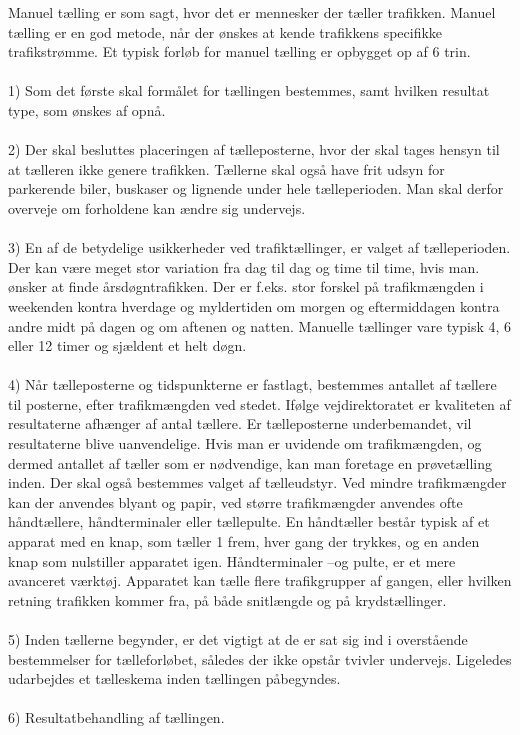 Manuel tælling er som sagt, hvor det er mennesker der tæller trafikken. Manuel tælling er en god metode,
når der ønskes at kende trafikkens specifikke trafikstrømme. Et typisk forløb for manuel tælling er opbygget
op af 6 trin.
\\\\
1) Som det første skal formålet for tællingen bestemmes, samt hvilken resultat type, som ønskes af opnå.
\\\\
2) Der skal besluttes placeringen af tælleposterne, hvor der skal tages hensyn til at tælleren ikke genere
trafikken. Tællerne skal også have frit udsyn for parkerende biler, buskaser og lignende under hele
tælleperioden. Man skal derfor overveje om forholdene kan ændre sig undervejs.
\\\\
3) En af de betydelige usikkerheder ved trafiktællinger, er valget af tælleperioden. Der kan være meget stor
variation fra dag til dag og time til time, hvis man. ønsker at finde årsdøgntrafikken. Der er f.eks. stor forskel
på trafikmængden i weekenden kontra hverdage og myldertiden om morgen og eftermiddagen kontra
andre midt på dagen og om aftenen og natten. Manuelle tællinger vare typisk 4, 6 eller 12 timer og
sjældent et helt døgn.
\\\\
4) Når tælleposterne og tidspunkterne er fastlagt, bestemmes antallet af tællere til posterne, efter
trafikmængden ved stedet. Ifølge vejdirektoratet er kvaliteten af resultaterne afhænger af antal tællere. Er
tælleposterne underbemandet, vil resultaterne blive uanvendelige. Hvis man er uvidende om
trafikmængden, og dermed antallet af tæller som er nødvendige, kan man foretage en prøvetælling inden.
Der skal også bestemmes valget af tælleudstyr. Ved mindre trafikmængder kan der anvendes blyant og papir, ved større trafikmængder anvendes ofte håndtællere, håndterminaler eller tællepulte.
En håndtæller består typisk af et apparat med en knap, som tæller 1 frem, hver gang der trykkes, og en anden knap som nulstiller apparatet igen. Håndterminaler –og pulte, er et mere avanceret værktøj. Apparatet kan tælle flere trafikgrupper af gangen, eller hvilken retning trafikken kommer fra, på både snitlængde og på krydstællinger.
\\\\
5) Inden tællerne begynder, er det vigtigt at de er sat sig ind i overstående bestemmelser for tælleforløbet, således der ikke opstår tvivler undervejs. Ligeledes udarbejdes et tælleskema inden tællingen påbegyndes.
\\\\
6) Resultatbehandling af tællingen.
